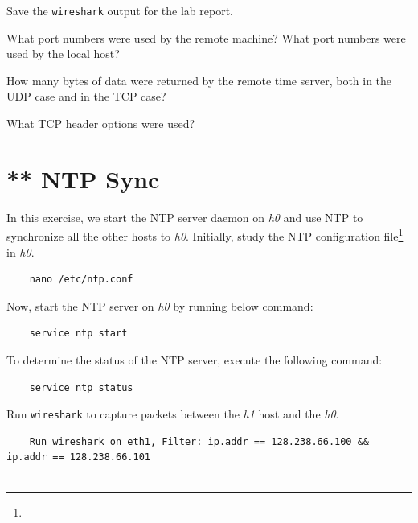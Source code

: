 \documentclass{UTNetLab}
\begin{document}
    Save the \lstinline{wireshark} output for the lab report.

    \begin{report}
    \item What port numbers were used by the remote machine?
    What port numbers were used by the local host?
    
    \item How many bytes of data were returned by the remote time server, both in the UDP case and in the TCP case?
    
    \item What TCP header options were used?
    \end{report}

\section{** NTP Sync}
    In this exercise, we start the NTP server daemon on \textit{h0} and use NTP to
    synchronize all the other hosts to \textit{h0}. Initially, study the NTP configuration file\footnote{} in \textit{h0}. 

    \begin{lstlisting}
    nano /etc/ntp.conf
    \end{lstlisting}
    
    Now, start the NTP server on \textit{h0} by running below command:
    
    \begin{lstlisting}
    service ntp start
    \end{lstlisting}

    To determine the status of the NTP server, execute the following command:
    
    \begin{lstlisting}
    service ntp status
    \end{lstlisting}
    
Run \lstinline{wireshark} to capture packets between the \textit{h1} host and the \textit{h0}.
    
    \begin{lstlisting}
    Run wireshark on eth1, Filter: ip.addr == 128.238.66.100 && ip.addr == 128.238.66.101
       
    \end{lstlisting}
    
\end{document}
